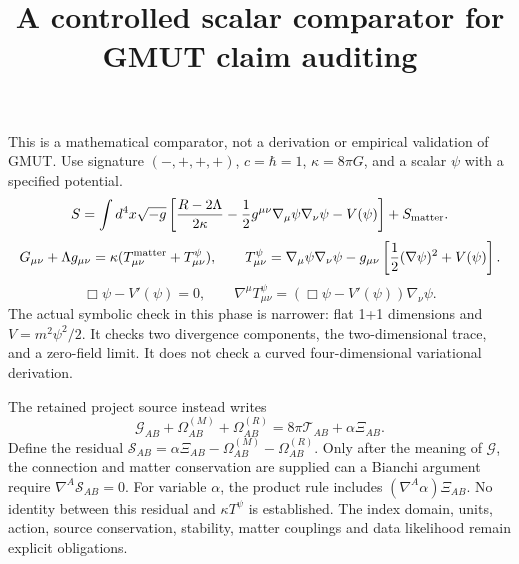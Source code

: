 \documentclass{article}
\begin{document}
\title{A controlled scalar comparator for GMUT claim auditing}
\maketitle
This is a mathematical comparator, not a derivation or empirical validation of GMUT.
Use signature $(-,+,+,+)$, $c=\hbar=1$, $\kappa=8\pi G$, and a scalar $\psi$ with a specified potential.
\[
S=\int d^4x\sqrt{-g}\left[\frac{R-2\Lambda}{2\kappa}
-\frac12g^{\mu\nu}\nabla_\mu\psi\nabla_\nu\psi-V(\psi)\right]+S_{\rm matter}.
\]
\[
G_{\mu\nu}+\Lambda g_{\mu\nu}
=\kappa(T^{\rm matter}_{\mu\nu}+T^\psi_{\mu\nu}),\qquad
T^\psi_{\mu\nu}=\nabla_\mu\psi\nabla_\nu\psi
-g_{\mu\nu}\left[\frac12(\nabla\psi)^2+V(\psi)\right].
\]
\[
\Box\psi-V'(\psi)=0,\qquad
\nabla^\mu T^\psi_{\mu\nu}=(\Box\psi-V'(\psi))\nabla_\nu\psi.
\]
The actual symbolic check in this phase is narrower: flat 1+1 dimensions and $V=m^2\psi^2/2$.
It checks two divergence components, the two-dimensional trace, and a zero-field limit.
It does not check a curved four-dimensional variational derivation.

The retained project source instead writes
\[
\mathcal G_{AB}+\Omega^{(M)}_{AB}+\Omega^{(R)}_{AB}
=8\pi\mathcal T_{AB}+\alpha\Xi_{AB}.
\]
Define the residual $\mathcal S_{AB}=\alpha\Xi_{AB}-\Omega^{(M)}_{AB}-\Omega^{(R)}_{AB}$.
Only after the meaning of $\mathcal G$, the connection and matter conservation are supplied
can a Bianchi argument require $\nabla^A\mathcal S_{AB}=0$.
For variable $\alpha$, the product rule includes $(\nabla^A\alpha)\Xi_{AB}$.
No identity between this residual and $\kappa T^\psi$ is established.
The index domain, units, action, source conservation, stability, matter couplings and data likelihood remain explicit obligations.
\end{document}
